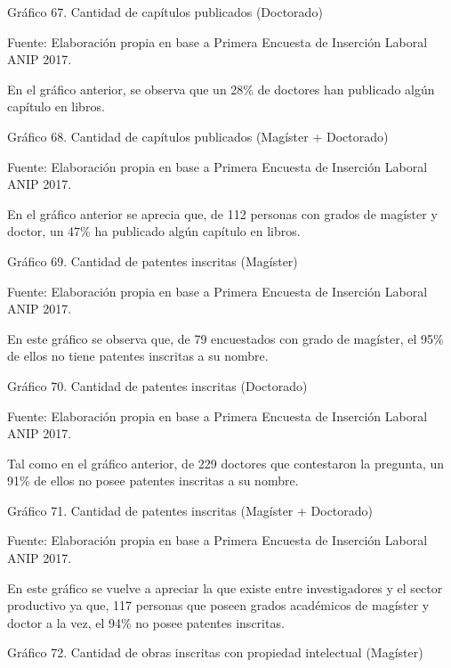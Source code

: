 \documentclass{article}
\begin{document}
Gráfico 67. Cantidad de capítulos publicados (Doctorado)


Fuente: Elaboración propia en base a Primera Encuesta de Inserción Laboral ANIP 2017.

En el gráfico anterior, se observa que un 28\% de doctores han publicado algún capítulo en libros.

Gráfico 68. Cantidad de capítulos publicados (Magíster + Doctorado)


Fuente: Elaboración propia en base a Primera Encuesta de Inserción Laboral ANIP 2017.

En el gráfico anterior se aprecia que, de 112 personas con grados de magíster y doctor, un 47\% ha publicado algún capítulo en libros.

Gráfico 69. Cantidad de patentes inscritas (Magíster)


Fuente: Elaboración propia en base a Primera Encuesta de Inserción Laboral ANIP 2017.

En este gráfico se observa que, de 79 encuestados con grado de magíster, el 95\% de ellos no tiene patentes inscritas a su nombre.

Gráfico 70. Cantidad de patentes inscritas (Doctorado)


Fuente: Elaboración propia en base a Primera Encuesta de Inserción Laboral ANIP 2017.

Tal como en el gráfico anterior, de 229 doctores que contestaron la pregunta, un 91\% de ellos no posee patentes inscritas a su nombre.

Gráfico 71. Cantidad de patentes inscritas (Magíster + Doctorado)


Fuente: Elaboración propia en base a Primera Encuesta de Inserción Laboral ANIP 2017.

En este gráfico se vuelve a apreciar la que existe entre investigadores y el sector productivo ya que, 117 personas que poseen grados académicos de magíster y doctor a la vez, el 94\% no posee patentes inscritas.

Gráfico 72. Cantidad de obras inscritas con propiedad intelectual (Magíster)
\end{document}
